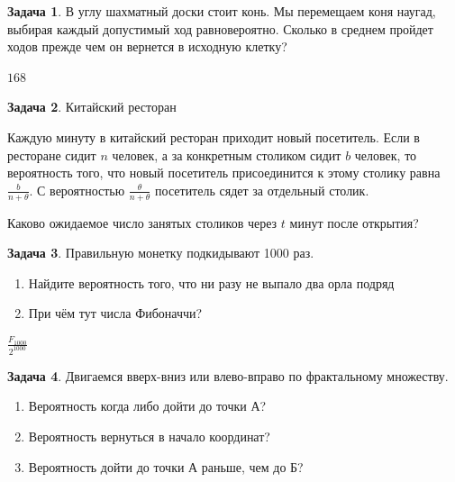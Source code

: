 \documentclass[nobib]{tufte-handout}
\theoremstyle{definition}
\newtheorem{problem}{Задача}
\begin{document}
\begin{problem}
В углу шахматный доски стоит конь. Мы перемещаем коня наугад, выбирая каждый допустимый ход равновероятно. Сколько в среднем пройдет ходов прежде чем он вернется в исходную клетку?

\begin{sol}
$168$
\end{sol}


\end{problem}


\begin{problem}
Китайский ресторан

Каждую минуту в китайский ресторан приходит новый посетитель.
Если в ресторане сидит $n$ человек, а за конкретным столиком сидит $b$ человек, то вероятность того, что новый посетитель присоединится к этому столику равна $\frac{b}{n+\theta}$. С вероятностью $\frac{\theta}{n+\theta}$ посетитель сядет за отдельный столик.

Каково ожидаемое число занятых столиков через $t$ минут после открытия?

\begin{sol}

\end{sol}

\end{problem}


\begin{problem}
Правильную монетку подкидывают 1000 раз.
\begin{enumerate}
\item Найдите вероятность того, что ни разу не выпало два орла подряд
\item При чём тут числа Фибоначчи?
\end{enumerate}

\begin{sol}
$\frac{F_{1000}}{2^{1000}}$
\end{sol}

\end{problem}


\begin{problem}
Двигаемся вверх-вниз или влево-вправо по фрактальному множеству.

\begin{enumerate}
\item Вероятность когда либо дойти до точки А?
\item Вероятность вернуться в начало координат?
\item Вероятность дойти до точки А раньше, чем до Б?
\end{enumerate}

\begin{sol}

\end{sol}

\end{problem}
\end{document}
